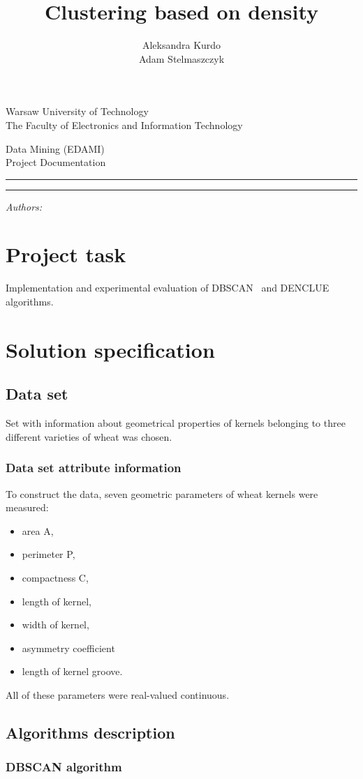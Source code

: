 \documentclass[12pt, a4paper, notitlepage, oneside]{article}
\title{Clustering based on density}
\author{Aleksandra Kurdo\\ Adam Stelmaszczyk}
\makeatletter
\newcommand{\linia}{\rule{\linewidth}{0.4mm}}
\renewcommand{\maketitle}{
\begin{titlepage}

    \vspace*{1cm}

    \begin{center}\small

    Warsaw University of Technology\\
    The Faculty of Electronics and Information Technology\\

    \end{center}

    \vspace{3cm}

     \begin{center}

    Data Mining (EDAMI)\\ Project Documentation

    \end{center}

    \noindent\linia

    \begin{center}

      \LARGE \textsc{\@title}

         \end{center}

     \noindent\linia

    \vspace{0.5cm}

    \begin{flushright}

    \begin{minipage}{5cm}

    \textit{\small Authors:}\\

    \normalsize \textsc{\@author} \par

    \end{minipage}

    \vspace{4cm}
    
 

     \end{flushright}

    \vspace*{\stretch{6}}

    \begin{center}

    \@date

    \end{center}

  \end{titlepage}
}
\makeatother
\begin{document}
\maketitle


\onehalfspacing


\section*{Project task}
Implementation and experimental evaluation of DBSCAN~\cite{dbscan} and DENCLUE~\cite{denclue} algorithms. 

\section*{Solution specification}

\subsection*{Data set}

Set with information about geometrical properties of kernels belonging to three different varieties of wheat was chosen.

\subsubsection*{Data set attribute information}


To construct the data, seven geometric parameters of wheat kernels were measured: 

\begin{itemize}
	\item area A, 
	\item perimeter P, 
	\item compactness C, 
	\item length of kernel, 
	\item width of kernel, 
	\item asymmetry coefficient 
	\item length of kernel groove. 
\end{itemize}

All of these parameters were real-valued continuous.


\subsection*{Algorithms description}
 
\subsubsection*{DBSCAN algorithm}
\end{document}
